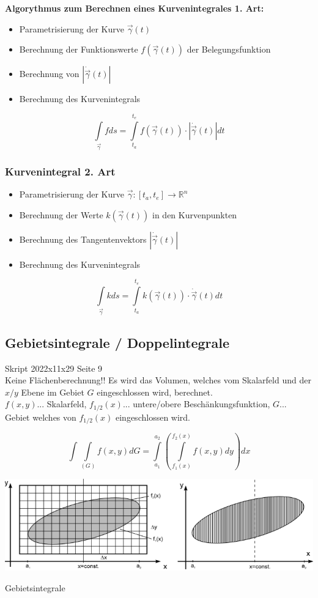 \textbf{Algorythmus zum Berechnen eines Kurvenintegrales 1. Art:}
\begin{itemize}
	\item Parametrisierung der Kurve $\vec{\gamma}(t)$
	\item Berechnung der Funktionswerte $f(\vec{\gamma}(t))$ der Belegungsfunktion
	\item Berechnung von $|\dot{\vec{\gamma}}(t)|$
	\item Berechnung des Kurvenintegrals
\end{itemize}
$$\int\limits_{\vec{\gamma}} fds = \int\limits_{t_a}^{t_e}f(\vec{\gamma} (t))\cdot |\dot{\vec{\gamma}}(t)|dt$$

\subsubsection{Kurvenintegral 2. Art}
\begin{itemize}
	\item Parametrisierung der Kurve $\vec{\gamma}:[t_a,t_e]\to \mathbb{R}^n$
	\item Berechnung der Werte $k(\vec{\gamma}(t))$ in den Kurvenpunkten
	\item Berechnung des Tangentenvektors $|\dot{\vec{\gamma}}(t)|$
	\item Berechnung des Kurvenintegrals
\end{itemize}
$$\int\limits_{\vec{\gamma}} kds = \int\limits_{t_a}^{t_e}k(\vec{\gamma} (t))\cdot \dot{\vec{\gamma}}(t)dt$$

\subsection{Gebietsintegrale / Doppelintegrale}
Skript 2022x11x29 Seite 9\\

Keine Flächenberechnung!! Es wird das Volumen, welches vom Skalarfeld und der $x/y$ Ebene im Gebiet $G$ eingeschlossen wird, berechnet.\\

$f(x,y)$... Skalarfeld, $f_{1/2}(x)$... untere/obere \grqq Beschänkungsfunktion\grqq{}, $G$... Gebiet welches von $f_{1/2}(x)$ eingeschlossen wird.

\[\int \int\limits_{(G)}f(x,y) dG = \int\limits_{a_1}^{a_2} \left( \int\limits_{f_1(x)}^{f_2(x)}f(x,y)dy\right)dx\]

\captionsetup{type=figure}
\includegraphics[width= \textwidth]{../pictures/Gebietsintegrale.png}
\caption{Gebietsintegrale}\label{fig:Gebietsintegrale}

